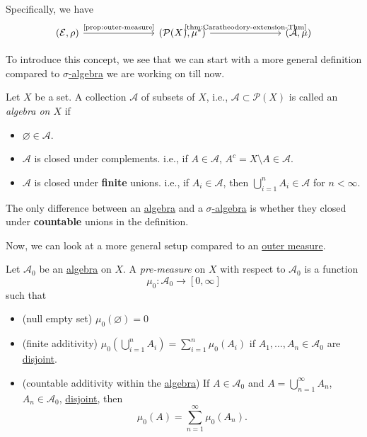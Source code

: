Specifically, we have
\[
	\begin{tikzcd}
		(\mathcal{E}, \rho) \ar[rrr, "\text{\autoref{prop:outer-measure}}"] &&& (\mathcal{P}(X), \mu^{\ast} ) \ar[rrr, "\text{\autoref{thm:Caratheodory-extension-Thm}}"] &&& (\mathcal{A} , \mu)
	\end{tikzcd}
\]

\par To introduce this concept, we see that we can start with a more general definition compared to \hyperref[def:sigma-algebra]{\(\sigma\)-algebra} we are working on till now.
\begin{definition}[Algebra]\label{def:algebra}
	Let \(X\) be a set. A collection \(\mathcal{A} \) of subsets of \(X\), i.e., \(\mathcal{A}\subset \mathcal{P} (X) \) is called an \emph{algebra on \(X\)} if
	\begin{itemize}
		\item \(\varnothing \in \mathcal{A} \).
		\item \(\mathcal{A} \) is closed under complements. i.e., if \(A\in \mathcal{A} \), \(A^c = X\setminus A\in \mathcal{A} \).
		\item \(\mathcal{A} \) is closed under \textbf{finite} unions. i.e., if \(A_i\in \mathcal{A} \), then \(\bigcup_{i=1}^{n} A_{i}\in \mathcal{A} \) for \(n<\infty \).
	\end{itemize}
\end{definition}
\begin{remark}
	The only difference between an \hyperref[def:algebra]{algebra} and a \hyperref[def:sigma-algebra]{\(\sigma\)-algebra} is whether they closed under \textbf{countable} unions in the definition.
\end{remark}

\par Now, we can look at a more general setup compared to an \hyperref[def:outer-measure]{outer measure}.
\begin{definition}\label{def:pre-measure}
	Let \(\mathcal{A} _0\) be an \hyperref[def:algebra]{algebra} on \(X\). A \emph{pre-measure} on \(X\) with respect to \(\mathcal{A} _0\) is a function
	\[
		\mu_0 \colon \mathcal{A} _0\to [0, \infty ]
	\]
	such that
	\begin{itemize}
		\item\label{def:pre-measure-null-empty-set}(null empty set) \(\mu_0(\varnothing ) = 0\)
		\item\label{def:pre-measure-finite-additivity}(finite additivity) \(\mu_0\left(\bigcup_{i=1}^{n} A_{i}\right) = \sum_{i=1}^{n} \mu_0(A_{i})\) if
		      \(A_1, \dots , A_n\in \mathcal{A} _0 \) are \underline{disjoint}.
		\item\label{def:pre-measure-countable-additivity-within-the-algebra}(countable additivity within the \hyperref[def:algebra]{algebra}) If \(A\in\mathcal{A} _0\) and \(A = \bigcup_{n=1}^{\infty} A_{n}\),
		      \(A_n\in\mathcal{A} _0\), \underline{disjoint}, then
		      \[
			      \mu_0(A) = \sum_{n=1}^{\infty} \mu_0(A_{n}).
		      \]
	\end{itemize}
\end{definition}

